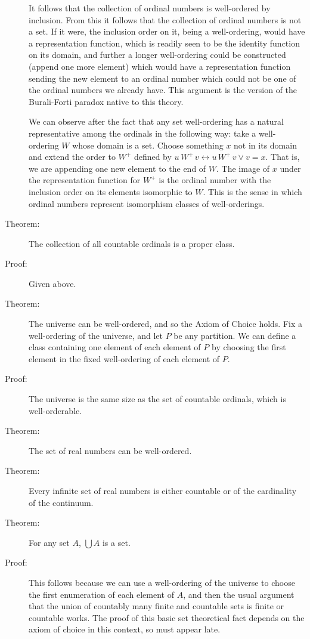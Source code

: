 \documentclass[12pt]{article}
\begin{document}
\begin{description}
It follows that the collection of ordinal numbers is well-ordered by inclusion.  From this it follows that the collection of ordinal numbers is not a set.  If it were, the inclusion order on it, being a well-ordering, would have a representation function, which is readily seen to be the identity function on its domain, and further a longer well-ordering could be constructed
(append one more element) which would have a representation function sending the new element to an ordinal number which could not be one of the ordinal numbers we already have.  This argument is the version of the Burali-Forti paradox native to this theory.

We can observe after the fact that any set well-ordering has a natural representative among the ordinals  in the following way:  take a well-ordering $W$ whose domain is a set.  Choose something $x$ not in its domain and extend the order to $W^+$  defined by $u \, W^+ \, v \leftrightarrow u \, W^+ \, v \vee v=x$.  That is, we are appending one new element to the end of $W$.
The image of $x$ under the representation function for $W^+$ is the ordinal number with the  inclusion order on its elements  isomorphic to $W$.  This is the sense in which ordinal numbers represent isomorphism classes of well-orderings.


\item[Theorem:]  The collection of all countable ordinals is a proper class.

\item[Proof:] Given above.

\item[Theorem:]  The universe can be well-ordered, and so the Axiom of Choice holds.  Fix a well-ordering of the universe, and let $P$ be any partition.  We can define a class containing one element of each element of $P$ by choosing the first element in the fixed well-ordering of each element of $P$.

\item[Proof:]  The universe is the same size as the set of countable ordinals, which is well-orderable.

\item[Theorem:]  The set of real numbers can be well-ordered.

\item[Theorem:]  Every infinite set of real numbers is either countable or of the cardinality of the continuum.

\item[Theorem:]  For any set $A$, $\bigcup A$ is a set.

\item[Proof:]  This follows because we can use a well-ordering of the universe to choose the first enumeration of each element of $A$, and then the usual argument
that the union of countably many finite and countable sets is finite or countable works.  The proof of this basic set theoretical fact depends on the axiom of choice in this context, so must appear late.

\end{description}
\end{document}
